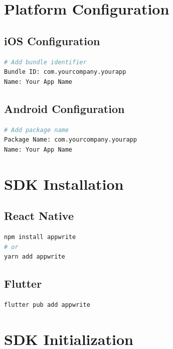 \documentclass[11pt,a4paper,oneside]{book}
\begin{document}
\section{Platform Configuration}

\subsection{iOS Configuration}

\begin{lstlisting}[language=bash, caption=iOS Setup]
# Add bundle identifier
Bundle ID: com.yourcompany.yourapp
Name: Your App Name
\end{lstlisting}

\subsection{Android Configuration}

\begin{lstlisting}[language=bash, caption=Android Setup]
# Add package name
Package Name: com.yourcompany.yourapp
Name: Your App Name
\end{lstlisting}

\section{SDK Installation}

\subsection{React Native}

\begin{lstlisting}[language=bash, caption=Install Appwrite SDK]
npm install appwrite
# or
yarn add appwrite
\end{lstlisting}

\subsection{Flutter}

\begin{lstlisting}[language=bash, caption=Flutter Installation]
flutter pub add appwrite
\end{lstlisting}

\section{SDK Initialization}
\end{document}

